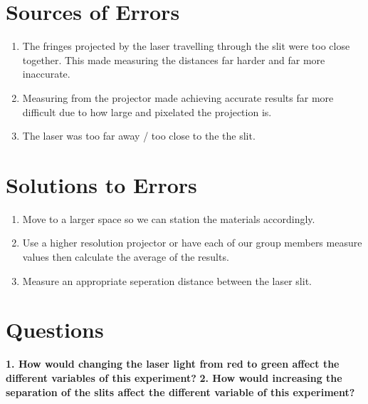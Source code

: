 \documentclass{article}
\begin{document}
\section*{Sources of Errors} {
  \begin{enumerate}
      \item {The fringes projected by the laser travelling through the slit were too close together. This made measuring the distances far harder and far more inaccurate.}
      \item {Measuring from the projector made achieving accurate results far more difficult due to how large and pixelated the projection is.}
      \item {The laser was too far away / too close to the the slit.}
  \end{enumerate}
 }
\section*{Solutions to Errors} {
  \begin{enumerate}
      \item {Move to a larger space so we can station the materials accordingly.}
      \item {Use a higher resolution projector or have each of our group members measure values then calculate the average of the results.}
      \item {Measure an appropriate seperation distance between the laser slit.}
  \end{enumerate}\leavevmode
 }
\section*{Questions} {
  \textbf{1. How would changing the laser light from red to green affect the different variables of this experiment?}
  \textbf{2. How would increasing the separation of the slits affect the different variable of this experiment?}
 }
\end{document}
